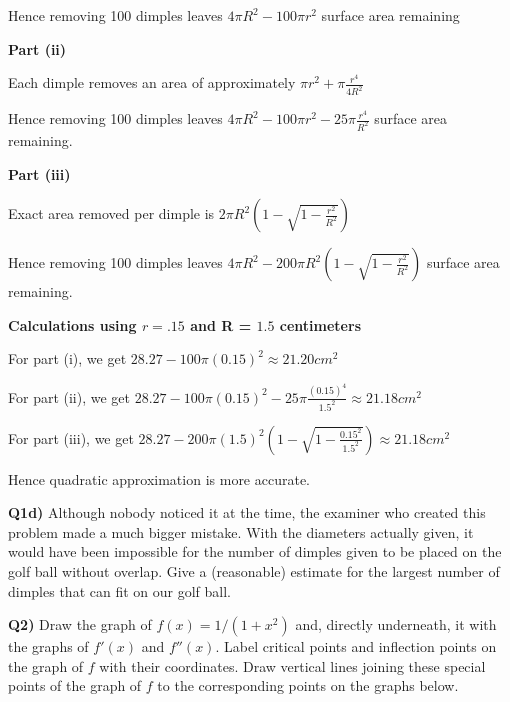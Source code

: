 \documentclass[9pt]{article}
\begin{document}
Hence removing 100 dimples leaves $4 \pi R^2 - 100 \pi r^2$ surface area remaining

\textbf{Part (ii)}

Each dimple removes an area of approximately $\pi r^2 + \pi \frac{r^4}{4R^2}$

Hence removing 100 dimples leaves $4 \pi R^2 - 100 \pi r^2 - 25 \pi \frac{r^4}{R^2}$ surface area remaining.

\textbf{Part (iii)}

Exact area removed per dimple is $2 \pi R^2 (1 - \sqrt{1 - \frac{r^2}{R^2}})$

Hence removing 100 dimples leaves $4 \pi R^2 - 200 \pi R^2 (1 - \sqrt{1 - \frac{r^2}{R^2}})$ surface area remaining.

\textbf{Calculations using $r = .15$ and R = $1.5$ centimeters}

For part (i), we get $28.27 - 100 \pi (0.15)^2 \approx 21.20 cm^2$

For part (ii), we get $28.27 - 100 \pi (0.15)^2 - 25 \pi \frac{(0.15)^4}{1.5^2} \approx 21.18 cm^2$

For part (iii), we get $28.27 - 200 \pi (1.5)^2 (1 - \sqrt{1 - \frac{0.15^2}{1.5^2}}) \approx 21.18cm^2$

Hence quadratic approximation is more accurate.


\begin{tcolorbox}
  \textbf{Q1d)} Although nobody noticed it at the time, the examiner who created this problem made a much bigger mistake. With the diameters actually given, it would have been impossible for the number of dimples given to be placed on the golf ball without overlap. Give a (reasonable) estimate for the largest number of dimples that can fit on our golf ball.
\end{tcolorbox}


\begin{tcolorbox}
  \textbf{Q2)} Draw the graph of $f(x) = 1/(1 + x^2)$ and, directly underneath, it with the graphs of $f'(x)$ and $f''(x)$. Label critical points and inflection points on the graph of $f$ with their coordinates. Draw vertical lines joining these special points of the graph of $f$ to the corresponding points on the graphs below.
\end{tcolorbox}
\end{document}
